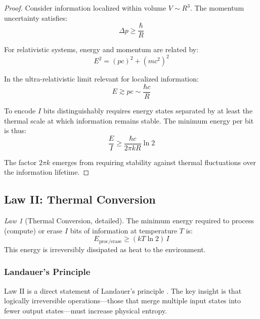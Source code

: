\documentclass[11pt,a4paper]{article}
\theoremstyle{plain}
\theoremstyle{definition}
\theoremstyle{remark}
\newtheorem{law}{Law}
\begin{document}
\begin{proof}
Consider information localized within volume $V \sim R^3$. The momentum uncertainty satisfies:
\begin{equation}
\Delta p \geq \frac{\hbar}{R}
\end{equation}

For relativistic systems, energy and momentum are related by:
\begin{equation}
E^2 = (pc)^2 + (mc^2)^2
\end{equation}

In the ultra-relativistic limit relevant for localized information:
\begin{equation}
E \gtrsim pc \sim \frac{\hbar c}{R}
\end{equation}

To encode $I$ bits distinguishably requires energy states separated by at least the thermal scale at which information remains stable. The minimum energy per bit is thus:
\begin{equation}
\frac{E}{I} \geq \frac{\hbar c}{2\pi k R}\ln 2
\end{equation}

The factor $2\pi k$ emerges from requiring stability against thermal fluctuations over the information lifetime.
\end{proof}

\subsection{Law II: Thermal Conversion}

\begin{law}[Thermal Conversion, detailed]
The minimum energy required to process (compute) or erase $I$ bits of information at temperature $T$ is:
\begin{equation}
E_{\text{proc/erase}} \geq (kT\ln 2)\,I
\label{eq:landauer_general}
\end{equation}
This energy is irreversibly dissipated as heat to the environment.
\end{law}

\subsubsection{Landauer's Principle}

Law II is a direct statement of Landauer's principle \cite{landauer1961irreversibility}. The key insight is that logically irreversible operations—those that merge multiple input states into fewer output states—must increase physical entropy.
\end{document}
